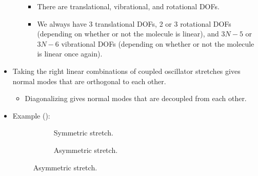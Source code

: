\documentclass[../notes.tex]{subfiles}
\begin{document}
\begin{itemize}
\begin{itemize}
        \begin{itemize}
            \item There are translational, vibrational, and rotational DOFs.
            \item We always have 3 translational DOFs, 2 or 3 rotational DOFs (depending on whether or not the molecule is linear), and $3N-5$ or $3N-6$ vibrational DOFs (depending on whether or not the molecule is linear once again).
        \end{itemize}
    \end{itemize}
    \item Taking the right linear combinations of coupled oscillator stretches gives normal modes that are orthogonal to each other.
    \begin{itemize}
        \item Diagonalizing gives normal modes that are decoupled from each other.
    \end{itemize}
    \item Example ():
    \begin{figure}[h!]
        \centering
        \begin{subfigure}[b]{0.3\linewidth}
            \centering
            \caption{Symmetric stretch.}
            \label{fig:H2ONormalModesa}
        \end{subfigure}
        \begin{subfigure}[b]{0.3\linewidth}
            \centering
            \caption{Asymmetric stretch.}
            \label{fig:H2ONormalModesb}

\end{subfigure}
\end{figure}
\end{itemize}
\end{document}
